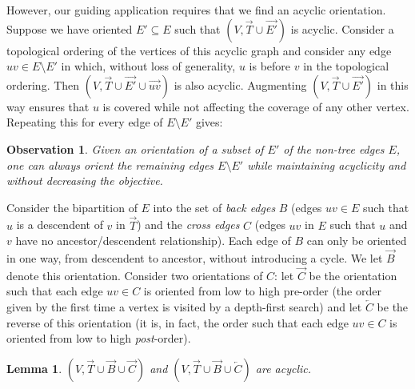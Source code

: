 \documentclass{article}
\newtheorem{lemma}[theorem]{Lemma}
\newtheorem{obs}[theorem]{Observation}
\begin{document}
However, our guiding application requires that we find an acyclic
orientation.  Suppose we have oriented $E' \subseteq E$ such that
$(V,\overrightarrow T\cup \overrightarrow{E'})$ is acyclic.  Consider
a topological ordering of the vertices of this acyclic graph and consider any
edge $uv \in E \setminus E'$ in which, without loss of generality,
$u$ is before $v$ in the topological ordering.  Then
$(V,\overrightarrow T\cup \overrightarrow{E'} \cup
\overrightarrow{uv})$ is also acyclic.  Augmenting $(V,\overrightarrow T\cup \overrightarrow{E'})$ in this way ensures that $u$ is
covered while not affecting the coverage of any other vertex.  Repeating this for every
edge of $E \setminus E'$ gives:

\begin{obs} \label{obs:complete} Given an orientation of a subset of
  $E'$ of the non-tree edges $E$, one can always orient the remaining
  edges $E \setminus E'$ while maintaining acyclicity and without decreasing 
  the objective.
\end{obs}

Consider the bipartition of $E$ into the set of {\em back edges} $B$
(edges $uv \in E$ such that $u$ is a descendent of $v$ in
$\overrightarrow T$) and the {\em cross edges} $C$ (edges $uv$ in $E$ such that $u$ and $v$  have no ancestor/descendent relationship).  Each edge of $B$ can
only be oriented in one way, from descendent to ancestor, without
introducing a cycle.  We let $\overrightarrow B$ denote this
orientation.  
Consider two orientations of $C$: let $\overrightarrow C$ be the
orientation such that each edge $uv \in C$ is oriented from low to
high pre-order (the order given by the first time a vertex is visited
by a depth-first search) and let $\overleftarrow C$ be the reverse of
this orientation (it is, in fact, the order such that each edge $uv
\in C$ is oriented from low to high {\em post}-order).

\begin{lemma}\label{lem:acyc}
  $(V,\overrightarrow T \cup \overrightarrow B \cup \overrightarrow C)$
and $(V,\overrightarrow T \cup \overrightarrow B \cup \overleftarrow
C)$ are acyclic.
\end{lemma}
\end{document}
